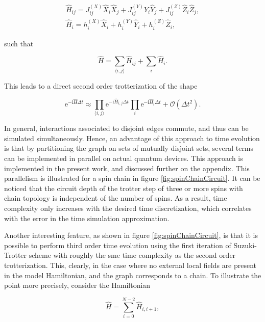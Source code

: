   \begin{gather}
    \hat{H}_{ij} = J_{ij}^{(X)} \hat{X}_i \hat{X}_j + J_{ij}^{(Y)} \hat{Y}_i \hat{Y}_j + J_{ij}^{(Z)} \hat{Z}_i \hat{Z}_j, \\
    \hat{H}_{i} = h_i^{(X)} \hat{X}_i + h_i^{(Y)} \hat{Y}_i + h_i^{(Z)} \hat{Z}_i,
    \label{eq:HamiltonianDecomposition}
  \end{gather}

  \noindent such that

  \begin{equation}
    \hat{H} = \sum_{\langle i,j \rangle} \hat{H}_{ij} + \sum_i \hat{H}_i.
  \end{equation}

  This leads to a direct second order trotterization of the shape

  \begin{equation}
    \mathrm{e}^{-\mathrm{i}\hat{H}\Delta t} \approx \prod_{\langle i,j \rangle} \mathrm{e}^{-\mathrm{i}\hat{H}_{i,j}\Delta t} \prod_{i} \mathrm{e}^{-\mathrm{i}\hat{H}_i \Delta t} + \mathcal{O}(\Delta t^2).
    \label{eq:HamiltonianTrotterization}
  \end{equation}

  In general, interactions associated to disjoint edges commute, and thus can be simulated simultaneously. Hence, an advantage of this approach to time evolution is that by partitioning the graph on sets of mutually disjoint sets, several terms can be implemented in parallel on actual quantum devices. This approach is implemented in the present work, and discussed further on the appendix. This parallelism is illustrated for a spin chain in figure \ref{fig:spinChainCircuit}. It can be noticed that the circuit depth of the trotter step of three or more spins with chain topology is independent of the number of spins. As a result, time complexity only increases with the desired time discretization, which correlates with the error in the time simulation approximation. 
  
  Another interesting feature, as shown in figure \ref{fig:spinChainCircuit}, is that it is possible to perform third order time evolution using the first iteration of Suzuki-Trotter scheme with roughly the sme time complexity as the second order trotterization. This, clearly, in the case where no external local fields are present in the model Hamiltonian, and the graph corresponds to a chain. To illustrate the point more precisely, consider the Hamiltonian

  \begin{equation}
    \hat{H} = \sum_{i=0}^{N-2} \hat{H}_{i,i+1},
    \label{eq:ChainHamiltonian}
  \end{equation}

